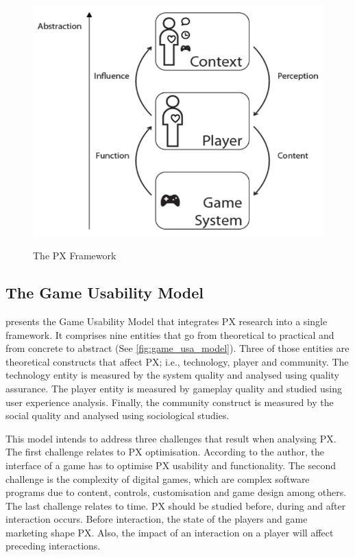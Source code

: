 \begin{figure}[bth]
\myfloatalign
{\includegraphics[width=.6\linewidth]{gfx/model/px_framework}} \quad
\caption[The PX Framework]{The \ac{PX} Framework \autocite{Nackea2}}\label{fig:px_framework}
\end{figure}

\subsection{The Game Usability Model}
\textcite{Nacked} presents the Game Usability Model that integrates \ac{PX} research into a single framework. It comprises nine entities that go from theoretical to practical and from concrete to abstract (See \autoref{fig:game_usa_model}). Three of those entities are theoretical constructs that affect \ac{PX}; i.e., technology, player and community. The technology entity is measured by the system quality and analysed using quality assurance. The player entity is measured by gameplay quality and studied using user experience analysis. Finally, the community construct is measured by the social quality and analysed using sociological studies.

This model intends to address three challenges that result when analysing \ac{PX}. The first challenge relates to \ac{PX} optimisation. According to the author, the interface of a game has to optimise \ac{PX} usability and functionality. The second challenge is the complexity of digital games, which are complex software programs due to content, controls, customisation and game design among others. The last challenge relates to time. \ac{PX} should be studied before, during and after interaction occurs. Before interaction, the state of the players and game marketing shape \ac{PX}. Also, the impact of an interaction on a player will affect preceding interactions.

